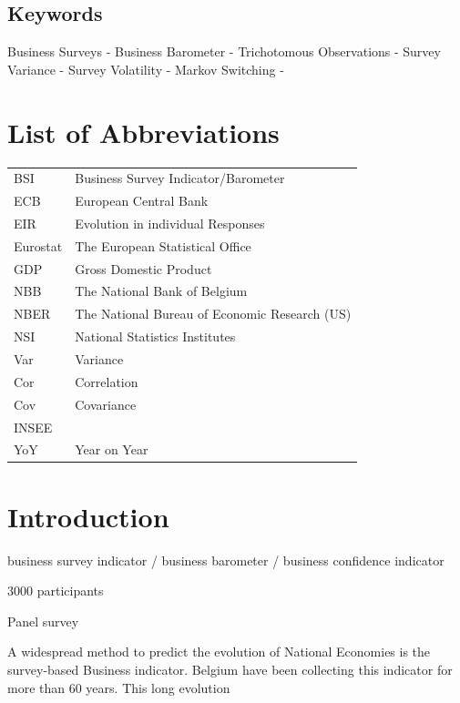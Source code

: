 \documentclass[12pt,a4paper,oneside]{book}
\begin{document}
\section*{Keywords}
Business Surveys - 
Business Barometer -
Trichotomous Observations -
Survey Variance - 
Survey Volatility -
Markov Switching - 



\chapter*{List of Abbreviations}

\begin{tabular}{l l}
  BSI   	& Business Survey Indicator/Barometer \\
  ECB   	& European Central Bank \\
  EIR   	& Evolution in individual Responses \\
  Eurostat & The European Statistical Office \\
  GDP   	& Gross Domestic Product \\
  NBB   	& The National Bank of Belgium \\
  NBER  	& The National Bureau of Economic Research (US) \\
  NSI   	& National Statistics Institutes \\
  Var 		& Variance \\
  Cor 		& Correlation \\
  Cov 	  & Covariance \\
  INSEE 	& \\
  YoY & Year on Year
  
\end{tabular}

\tableofcontents

\newpage
\setcounter{page}{0}


\chapter{Introduction}

business survey indicator / business barometer / business confidence indicator

3000 participants

Panel survey

A widespread method to predict the evolution of National Economies is the survey-based Business indicator. Belgium have been collecting this indicator for more than 60 years. This long evolution 
\end{document}
